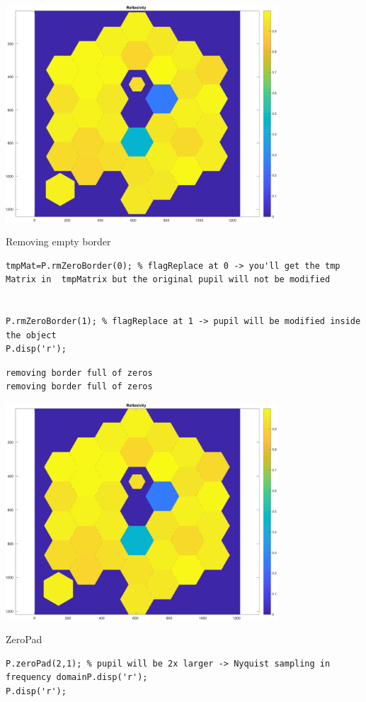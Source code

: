 \documentclass[12pt]{article}
\begin{document}
\includegraphics [width=4in]{docuPupilClass_12.pdf}
\begin{par}
Removing empty border
\end{par} \vspace{1em}
\begin{verbatim}
tmpMat=P.rmZeroBorder(0); % flagReplace at 0 -> you'll get the tmp Matrix in  tmpMatrix but the original pupil will not be modified


P.rmZeroBorder(1); % flagReplace at 1 -> pupil will be modified inside the object
P.disp('r');
\end{verbatim}

        \color{lightgray} \begin{verbatim}removing border full of zeros
removing border full of zeros
\end{verbatim} \color{black}
    
\includegraphics [width=4in]{docuPupilClass_13.pdf}
\begin{par}
ZeroPad
\end{par} \vspace{1em}
\begin{verbatim}
P.zeroPad(2,1); % pupil will be 2x larger -> Nyquist sampling in frequency domainP.disp('r');
P.disp('r');
\end{verbatim}
\end{document}
